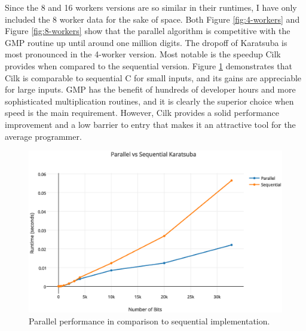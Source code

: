 \documentclass[8pt, twocolumn]{article}
\begin{document}
Since the 8 and 16 workers versions are so similar in their runtimes, I have
only included the 8 worker data for the sake of space.  Both Figure
\ref{fig:4-workers} and Figure \ref{fig:8-workers} show that the parallel
algorithm is competitive with the GMP routine up until around one million
digits.  The dropoff of Karatsuba is most pronounced in the 4-worker version.
Most notable is the speedup Cilk provides when compared to the sequential
version.  Figure \ref{fig:parallel-vs-sequential} demonstrates that Cilk is
comparable to sequential C for small inputs, and its gains are appreciable for
large inputs.  GMP has the benefit of hundreds of developer hours and more
sophisticated multiplication routines, and it is clearly the superior choice
when speed is the main requirement.  However, Cilk provides a solid performance
improvement and a low barrier to entry that makes it an attractive tool for the
average programmer.
\begin{figure}[H]
    \includegraphics[scale=0.4]{parallel-vs-sequential}
    \caption{Parallel performance in comparison to sequential implementation.}
    \label{fig:parallel-vs-sequential}
\end{figure}
\end{document}
